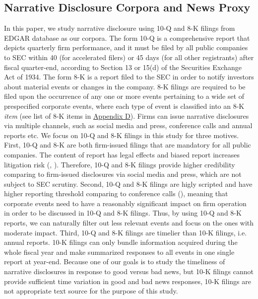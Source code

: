 \documentclass[a4paper]{article}
\begin{document}
\begin{spacing}{2}
\subsection{Narrative Disclosure Corpora and News Proxy} \label{sec2.2}
In this paper, we study narrative disclosure using 10-Q and 8-K filings from EDGAR database as our corpora. The form 10-Q is a comprehensive report that depicts quarterly firm performance, and it must be filed by all public companies to SEC within 40 (for accelerated filers) or 45 days (for all other registrants) after fiscal quarter-end, according to Section 13 or 15(d) of the Securities Exchange Act of 1934. The form 8-K is a report filed to the SEC in order to notify investors about material events or changes in the company. 8-K filings are required to be filed upon the occurrence of any one or more events pertaining to a wide set of prespecified corporate events, where each type of event is classified into an 8-K \textit{item} (see list of 8-K items in \hyperref[appd]{Appendix D}). Firms can issue narrative disclosures via multiple channels, such as social media and press, conference calls and annual reports etc. We focus on 10-Q and 8-K filings in this study for three motives. First, 10-Q and 8-K are both firm-issued filings that are mandatory for all public companies. The content of report has legal effects and biased report increases litigation risk (\cite{rogersDisclosureToneShareholder2011}, \cite{cazierWhenAreFirms2020}). Therefore, 10-Q and 8-K filings provide higher credibility comparing to firm-issued disclosures via social media and press, which are not subject to SEC scrutiny. Second, 10-Q and 8-K filings are higly scripted and have higher reporting threshold comparing to conference calls (\cite{hassanFirmLevelPoliticalRisk2019}), meaning that corporate events need to have a reasonably significant impact on firm operation in order to be discussed in 10-Q and 8-K filings. Thus, by using 10-Q and 8-K reports, we can naturally filter out less relevant events and focus on the ones with moderate impact. Third, 10-Q and 8-K filings are timelier than 10-K filings, i.e. annual reports. 10-K filings can only bundle information acquired during the whole fiscal year and make summarized responses to all events in one single report at year-end. Because one of our goals is to study the timeliness of narrative disclosures in response to good versus bad news, but 10-K filings cannot provide sufficient time variation in good and bad news responses, 10-K filings are not appropriate text source for the purpose of this study.


\end{spacing}
\end{document}
